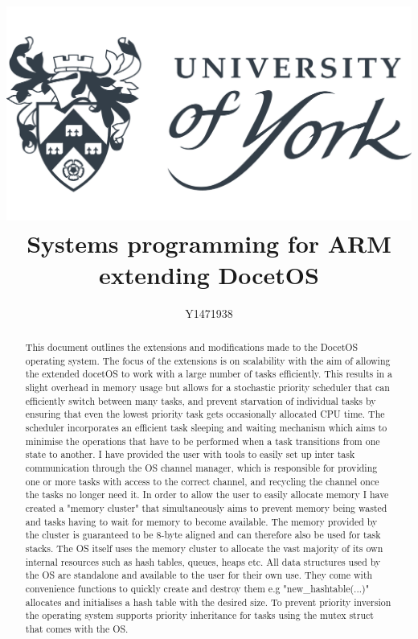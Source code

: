 \documentclass[12pt,a4paper]{article}
\author{Y1471938}
\title{
\includegraphics[width=\textwidth]{images/yorkUniLogo.png}\\
\textbf{Systems programming for ARM}\\ extending DocetOS}
\begin{document}
\maketitle
\begin{abstract}
This document outlines the extensions and modifications made to the DocetOS operating system. The focus of the extensions is on scalability with the aim of allowing the extended docetOS to work with a large number of tasks efficiently. This results in a slight overhead in memory usage but allows for a stochastic priority scheduler that can efficiently switch between many tasks, and prevent starvation of individual tasks by ensuring that even the lowest priority task gets occasionally allocated CPU time. The scheduler incorporates an efficient task sleeping and waiting mechanism which aims to minimise the operations that have to be performed when a task transitions from one state to another. I have provided the user with tools to easily set up inter task communication through the OS channel manager, which is responsible for providing one or more tasks with access to the correct channel, and recycling the channel once the tasks no longer need it. In order to allow the user to easily allocate memory I have created a "memory cluster" that simultaneously aims to prevent memory being wasted and tasks having to wait for memory to become available. The memory provided by the cluster is guaranteed to be 8-byte aligned and can therefore also be used for task stacks. The OS itself uses the memory cluster to allocate the vast majority of its own internal resources such as hash tables, queues, heaps etc. All data structures used by the OS are standalone and available to the user for their own use. They come with convenience functions to quickly create and destroy them e.g "new\_hashtable(...)" allocates and initialises a hash table with the desired size. To prevent priority inversion the operating system supports priority inheritance for tasks using the mutex struct that comes with the OS.
\end{abstract}
\pagebreak
\tableofcontents
\pagebreak
\end{document}
